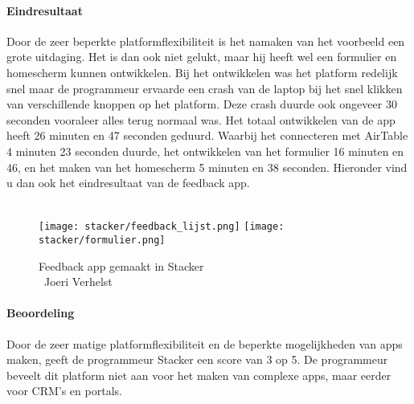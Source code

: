 \paragraph*{Eindresultaat}
Door de zeer beperkte platformflexibiliteit is het namaken van het voorbeeld een grote uitdaging. Het is dan ook niet gelukt, maar hij heeft wel een formulier en homescherm
kunnen ontwikkelen. Bij het ontwikkelen was het platform redelijk snel maar de programmeur ervaarde een crash van de laptop bij het snel klikken van verschillende knoppen op het platform.
Deze crash duurde ook ongeveer 30 seconden vooraleer alles terug normaal was. Het totaal ontwikkelen van de app heeft 26 minuten en 47 seconden geduurd. Waarbij het connecteren met AirTable 4 minuten 23 seconden duurde, het ontwikkelen van het formulier 16 minuten en 46,
en het maken van het homescherm 5 minuten en 38 seconden. Hieronder vind u dan ook het eindresultaat van de feedback app.
\\
\\

\begin{figure}[H]
    \texttt{[image: stacker/feedback\_lijst.png]}
    \texttt{[image: stacker/formulier.png]}
    \caption[Feedback app gemaakt in Stacker]{Feedback app gemaakt in Stacker\\\textcopyright\ Joeri Verhelst}
    \label{fig:feedback-app-stacker}
\end{figure}

\paragraph*{Beoordeling}
Door de zeer matige platformflexibiliteit en de beperkte mogelijkheden van apps maken, geeft de programmeur Stacker een score van 3 op 5.
De programmeur beveelt dit platform niet aan voor het maken van complexe apps, maar eerder voor CRM's en portals.

